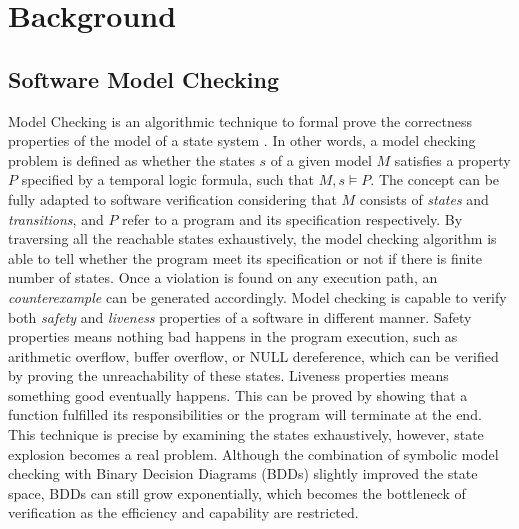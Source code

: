 
\chapter{Background}

\section{Software Model Checking} \label{sec:mc}
Model Checking is an algorithmic technique to formal prove the correctness properties of the model of a state system \cite{Clarke:2000:MC:332656, Clarke:2008:BMC:1423535.1423536}. In other words, a model checking problem is defined as whether the states $s$ of a given model $M$ satisfies a property $P$ specified by a temporal logic formula, such that $M, s \models P$. The concept can be fully adapted to software verification considering that $M$ consists of \textit{states} and \textit{transitions}, and $P$ refer to a program and its specification respectively. By traversing all the reachable states exhaustively, the model checking algorithm is able to tell whether the program meet its specification or not if there is finite number of states. Once a violation is found on any execution path, an \textit{counterexample} can be generated accordingly. Model checking is capable to verify both \textit{safety} and \textit{liveness} properties of a software in different manner. Safety properties means nothing bad happens in the program execution, such as arithmetic overflow, buffer overflow, or NULL dereference, which can be verified by proving the unreachability of these states. Liveness properties means something good eventually happens. This can be proved by showing that a function fulfilled its responsibilities or the program will terminate at the end. This technique is precise by examining the states exhaustively, however, state explosion becomes a real problem. Although the combination of symbolic model checking with Binary Decision Diagrams (BDDs) slightly improved the state space, BDDs can still grow exponentially, which becomes the bottleneck of verification as the efficiency and capability are restricted.
